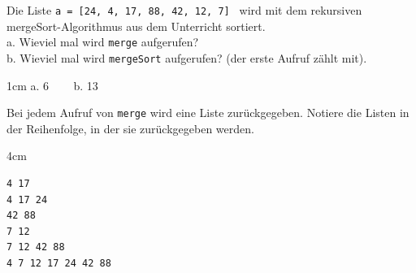 \question[5]
Die Liste \texttt{a = [24, 4, 17, 88, 42, 12, 7] } wird mit dem rekursiven mergeSort-Algorithmus aus dem Unterricht sortiert. \\
a. Wieviel mal wird \texttt{merge} aufgerufen?  \\
b. Wieviel mal wird \texttt{mergeSort} aufgerufen? (der erste Aufruf zählt mit).
\begin{solutionbox}{1cm}
a. 6   ~~~ b. 13
\end{solutionbox}
Bei jedem Aufruf von \texttt{merge} wird eine Liste zurückgegeben.
Notiere die Listen in der Reihenfolge, in der sie zurückgegeben werden.
\begin{solutionbox}{4cm}
\begin{lstlisting}
4 17
4 17 24
42 88
7 12
7 12 42 88
4 7 12 17 24 42 88
\end{lstlisting}
\end{solutionbox}
